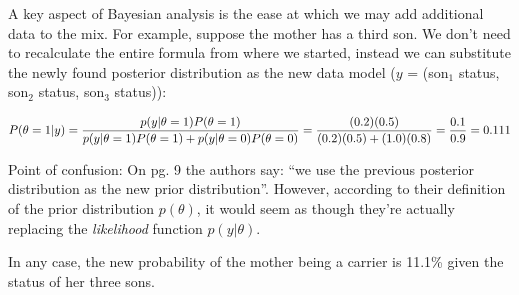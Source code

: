 \documentclass[]{book}
\begin{document}
A key aspect of Bayesian analysis is the ease at which we may add
additional data to the mix. For example, suppose the mother has a third
son. We don't need to recalculate the entire formula from where we
started, instead we can substitute the newly found posterior
distribution as the new data model (\(y\) = (son\(_1\) status, son\(_2\)
status, son\(_3\) status)):

\[
P(\theta = 1|y) = \frac{p(y|\theta = 1)P(\theta = 1)}{p(y|\theta = 1)P(\theta = 1) + p(y|\theta = 0)P(\theta = 0)}\\
= \frac{(0.2)(0.5)}{(0.2)(0.5) + (1.0)(0.8)} = \frac{0.1}{0.9} = 0.111
\]

Point of confusion: On pg. 9 the authors say: ``we use the previous
posterior distribution as the new prior distribution''. However,
according to their definition of the prior distribution \(p(\theta)\),
it would seem as though they're actually replacing the \emph{likelihood}
function \(p(y|\theta)\).

In any case, the new probability of the mother being a carrier is 11.1\%
given the status of her three sons.


\end{document}
